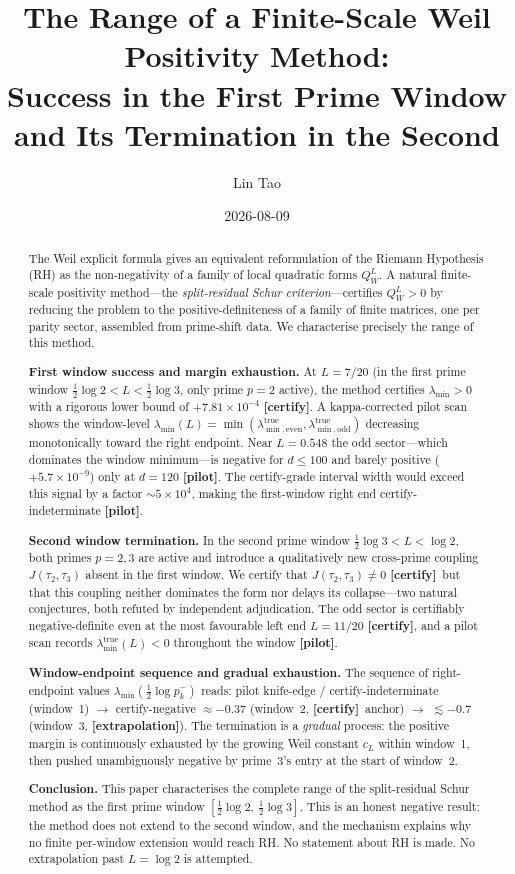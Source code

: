 \documentclass[12pt,a4paper]{amsart}
\title{The Range of a Finite-Scale Weil Positivity Method:\\
       Success in the First Prime Window and Its Termination in the Second}
\author{Lin Tao}
\date{2026-08-09}
\theoremstyle{plain}
\theoremstyle{definition}
\newcommand{\QW}{Q_W^L}
\newcommand{\lmin}{\lambda_{\min}}
\newcommand{\ltrue}{\lambda_{\min}^{\mathrm{true}}}
\newcommand{\ltrues}[1]{\lambda_{\min,\mathrm{#1}}^{\mathrm{true}}}
\newcommand{\cL}{c_L}
\newcommand{\Jcross}{J(\tau_2,\tau_3)}
\newcommand{\certify}{\textbf{[certify]}}
\newcommand{\pilot}{\textbf{[pilot]}}
\newcommand{\extrap}{\textbf{[extrapolation]}}
\begin{document}
\begin{abstract}
The Weil explicit formula gives an equivalent reformulation of the Riemann
Hypothesis (RH) as the non-negativity of a family of local quadratic forms
$\QW$.  A natural finite-scale positivity method---the
\emph{split-residual Schur criterion}---certifies $\QW > 0$ by reducing the
problem to the positive-definiteness of a family of finite matrices, one per
parity sector, assembled from prime-shift data.  We characterise precisely the
range of this method.

\textbf{First window success and margin exhaustion.}  At $L = 7/20$ (in the
first prime window $\tfrac12\log 2 < L < \tfrac12\log 3$, only prime $p=2$
active), the method certifies $\lmin > 0$ with a rigorous lower bound of
$+7.81\times10^{-4}$ \certify.  A kappa-corrected pilot scan shows the
window-level $\lambda_{\min}(L) = \min(\ltrues{even},
\ltrues{odd})$ decreasing monotonically toward the right endpoint.
Near $L=0.548$ the odd sector---which dominates the window minimum---is
negative for $d \le 100$ and barely positive ($+5.7\times10^{-9}$) only at
$d=120$ \pilot.  The certify-grade interval width would exceed this signal by a
factor $\sim 5\times10^4$, making the first-window right end
certify-indeterminate \pilot.

\textbf{Second window termination.}  In the second prime window
$\tfrac12\log 3 < L < \log 2$, both primes $p=2,3$ are active and introduce a
qualitatively new cross-prime coupling $\Jcross$ absent in the first window.
We certify that $\Jcross \neq 0$ \certify\ but that this coupling neither
dominates the form nor delays its collapse---two natural conjectures, both
refuted by independent adjudication.  The odd sector is certifiably
negative-definite even at the most favourable left end $L=11/20$ \certify, and
a pilot scan records $\ltrue(L) < 0$ throughout the window
\pilot.

\textbf{Window-endpoint sequence and gradual exhaustion.}  The sequence of
right-endpoint values $\lambda_{\min}\!\left(\tfrac12\log p_k^-\right)$ reads:
pilot knife-edge / certify-indeterminate (window~1) $\to$ certify-negative
$\approx -0.37$ (window~2, \certify~anchor) $\to$ $\lesssim -0.7$
(window~3, \extrap).  The termination is a \emph{gradual} process: the
positive margin is continuously exhausted by the growing Weil constant $\cL$
within window~1, then pushed unambiguously negative by prime~3's entry at the
start of window~2.

\textbf{Conclusion.}  This paper characterises the complete range of the
split-residual Schur method as the first prime window
$[\tfrac12\log 2,\, \tfrac12\log 3]$.  This is an honest negative result: the
method does not extend to the second window, and the mechanism explains why no
finite per-window extension would reach RH.  No statement about RH is made.
No extrapolation past $L = \log 2$ is attempted.
\end{abstract}
\end{document}

